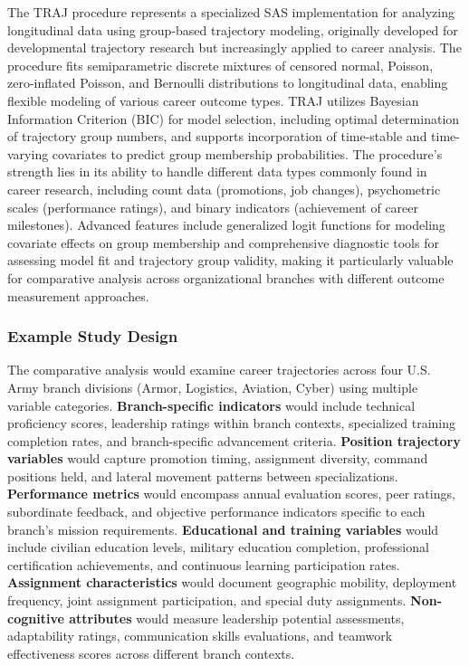 \documentclass[main.tex]{subfiles}
\begin{document}

The TRAJ procedure represents a specialized SAS implementation for analyzing longitudinal data using group-based trajectory modeling, originally developed for developmental trajectory research but increasingly applied to career analysis\parencite{Jones2001}. The procedure fits semiparametric discrete mixtures of censored normal, Poisson, zero-inflated Poisson, and Bernoulli distributions to longitudinal data, enabling flexible modeling of various career outcome types. TRAJ utilizes Bayesian Information Criterion (BIC) for model selection, including optimal determination of trajectory group numbers, and supports incorporation of time-stable and time-varying covariates to predict group membership probabilities. The procedure's strength lies in its ability to handle different data types commonly found in career research, including count data (promotions, job changes), psychometric scales (performance ratings), and binary indicators (achievement of career milestones). Advanced features include generalized logit functions for modeling covariate effects on group membership and comprehensive diagnostic tools for assessing model fit and trajectory group validity, making it particularly valuable for comparative analysis across organizational branches with different outcome measurement approaches.

\subsubsection{Example Study Design}


The comparative analysis would examine career trajectories across four U.S. Army branch divisions (Armor, Logistics, Aviation, Cyber) using multiple variable categories. \textbf{Branch-specific indicators} would include technical proficiency scores, leadership ratings within branch contexts, specialized training completion rates, and branch-specific advancement criteria. \textbf{Position trajectory variables} would capture promotion timing, assignment diversity, command positions held, and lateral movement patterns between specializations. \textbf{Performance metrics} would encompass annual evaluation scores, peer ratings, subordinate feedback, and objective performance indicators specific to each branch's mission requirements. \textbf{Educational and training variables} would include civilian education levels, military education completion, professional certification achievements, and continuous learning participation rates. \textbf{Assignment characteristics} would document geographic mobility, deployment frequency, joint assignment participation, and special duty assignments. \textbf{Non-cognitive attributes} would measure leadership potential assessments, adaptability ratings, communication skills evaluations, and teamwork effectiveness scores across different branch contexts.
\end{document}
